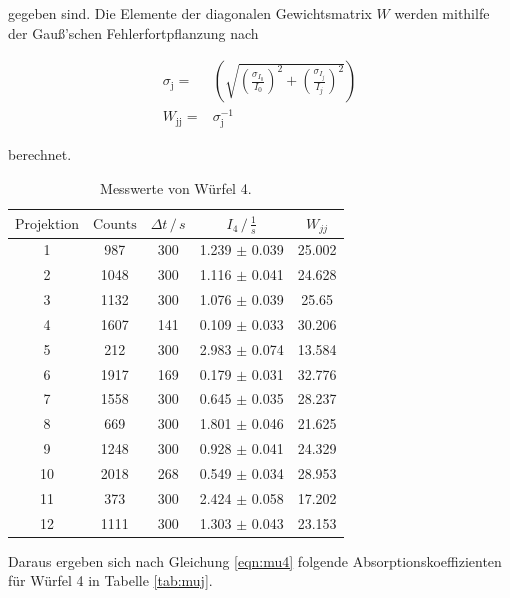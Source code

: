   \noindent
  gegeben sind.
  Die Elemente der diagonalen Gewichtsmatrix $W$ werden mithilfe der Gauß'schen Fehlerfortpflanzung nach
  
    \begin{align*}
        \sigma_{\text{j}}=& \left(\sqrt{\left(\frac{\sigma_{I_0}}{I_0}\right)^2+ \left(\frac{\sigma_{I_j}}{I_j}\right)^2}\right)\\
        W_{\text{jj}}=& \sigma_{\text{j}}^{-1}
    \end{align*}
    
    \noindent
    berechnet.

    \begin{table}
      \centering
      \begin{tabular}{c c c c c}
      \toprule
      $\text{Projektion}$ & $\text{Counts}$ & $\Delta t \,/\, s $ & $I_4 \,/\, \frac{1}{s} $ & $W_{jj}$\\
       \midrule 
    1  & 987  & 300 & 1.239  $\pm$ 0.039   & 25.002 \\
    2  & 1048 & 300 & 1.116 $\pm$ 0.041 &  24.628 \\
    3  & 1132 & 300 & 1.076 $\pm$ 0.039  & 25.65 \\
    4  & 1607 & 141 & 0.109 $\pm$ 0.033 &  30.206 \\
    5  & 212  & 300 & 2.983 $\pm$ 0.074  & 13.584 \\
    6  & 1917 & 169 & 0.179 $\pm$ 0.031 &  32.776 \\
    7  & 1558 & 300 & 0.645 $\pm$ 0.035  & 28.237 \\
    8  & 669  & 300 & 1.801  $\pm$ 0.046   &  21.625\\
    9  & 1248 & 300 & 0.928 $\pm$ 0.041  &  24.329\\
    10 &  2018 & 268 & 0.549 $\pm$  0.034 & 28.953  \\
    11 &  373  & 300 & 2.424 $\pm$ 0.058  & 17.202 \\
    12 &  1111 & 300 & 1.303 $\pm$ 0.043  & 23.153 \\
      \bottomrule
      \end{tabular}
      \caption{Messwerte von Würfel 4.}
      \label{tab:w4}
      \end{table}

\noindent
Daraus ergeben sich nach Gleichung \ref{eqn:mu4} folgende Absorptionskoeffizienten für Würfel 4 in Tabelle \ref{tab:muj}.

